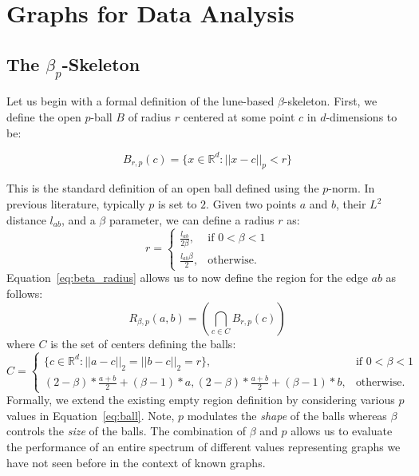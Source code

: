 
\chapter{Graphs for Data Analysis}
\label{ch:graphs}


\section{The $\beta_p$-Skeleton}
\label{sec:bpskeleton}
Let us begin with a formal definition of the lune-based $\beta$-skeleton.
%
First, we define the open $p$-ball $B$ of radius $r$ centered at some point $c$ in $d$-dimensions to be:

\begin{equation}
\label{eq:ball}
    B_{r,p}(c) = \{x \in \mathbb{R}^d : || x  - c ||_p < r\}
\end{equation}

This is the standard definition of an open ball defined using the $p$-norm.
%
In previous literature, typically $p$ is set to $2$.
%
Given two points $a$ and $b$, their $L^2$ distance $l_{ab}$, and a $\beta$ parameter, we can define a radius $r$ as:
%
\begin{equation}
    \label{eq:beta_radius}
    r =
    \begin{cases}
        \frac{l_{ab}}{2\beta}, & \text{if $0 < \beta < 1$}\\
        \frac{l_{ab}\beta}{2}, & \text{otherwise}.
    \end{cases}
\end{equation}
%
Equation~\ref{eq:beta_radius} allows us to now define the region for the edge $ab$ as follows:
%
\begin{equation}
    R_{\beta,p}(a,b) = \left(\bigcap_{c \in C} B_{r,p}(c)\right)
\end{equation}
%
where $C$ is the set of centers defining the balls:
%
\begin{equation}
C =
\begin{cases}
    \{c \in \mathbb{R}^d: ||a -c||_2 = ||b - c||_2 = r\}, & \text{if $0 < \beta < 1$}\\
    {(2-\beta)*\frac{a+b}{2} + (\beta-1)*a, (2-\beta)*\frac{a+b}{2} + (\beta-1)*b}, & \text{otherwise}.
\end{cases}
\end{equation}
%
Formally, we extend the existing empty region definition by considering various $p$ values in Equation~\ref{eq:ball}.
%
Note, $p$ modulates the \emph{shape} of the balls whereas $\beta$ controls the \emph{size} of the balls.
%
The combination of $\beta$ and $p$ allows us to evaluate the performance of an entire spectrum of different values representing graphs we have not seen before in the context of known graphs.

